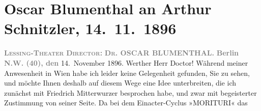

         
         \newcommand{\erwaehntePersonen}{Personen: Friedrich Mitterwurzer}
         \newcommand{\erwaehnteInstitutionen}{Institutionen: Lessing-Theater}
         \newcommand{\erwaehnteOrte}{Orte: Berlin, Wien}
         \newcommand{\erwaehnteWerke}{Werke: Abschiedssouper, Anatol, Die Frage an das Schicksal, Episode, Morituri, Weihnachts-Einkäufe}
               \section[Oscar Blumenthal an Arthur Schnitzler, 14. 11. 1896]{ Oscar Blumenthal an Arthur Schnitzler, 14. 11. 1896}\nopagebreak{}\rehead{ }\begin{ledgroupsized}[t]{13cm}\normalsize\beginnumbering \toendnotes[C]{\smallbreak\pagebreak[2]} 
\pstart
           \noindent{}\centering{}{\pb}\textcolor{gray}{\textbf{\textsc{Lessing-Theater}}}\pend
           \pstart
           \noindent{}\centering{}\textcolor{gray}{\textbf{\textsc{Director}:}}{ }\textcolor{gray}{\textbf{\textsc{Dr.}{ }OSCAR BLUMENTHAL.}}\pend
           \pstart
           \raggedleft{}\textcolor{gray}{\textbf{Berlin N.W. (40), den}}{ }14. November 1896.\pend
           \pstart\center{}Werther Herr Doctor!\pend\pstart
           Während meiner Anwesenheit in Wien habe ich
                    leider keine Gelegenheit gefunden, Sie zu sehen, und möchte Ihnen deshalb auf
                    diesem Wege eine Idee unterbreiten, die ich zunächst mit Friedrich Mitterwurzer besprochen habe, und zwar mit
                    begeisterter Zustimmung von seiner Seite. Da bei dem Einacter-Cyclus »MORITURI« das

\end{ledgroupsized}
